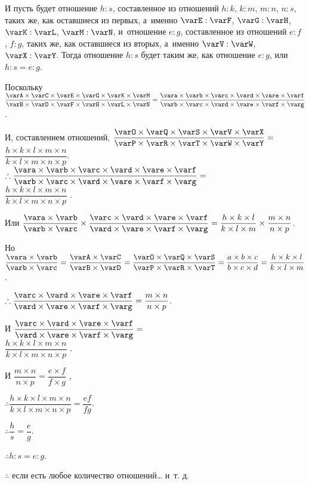 \documentclass[letters,booklanguage=russian]{byrnebook}
\begin{document}
И пусть будет отношение $h : s$, составленное из отношений $h : k$, $k : m$, $m : n$, $n : s$, таких же, как оставшиеся из первых, а~именно $\varE : \varF$, $\varG : \varH$, $\varK : \varL$, $\varM : \varN$, и~отношение $e : g$, составленное из отношений $e : f$ , $f : g$, таких же, как оставшиеся из вторых, а~именно $\varV : \varW$, $\varX : \varY$.  Тогда отношение $h : s$  будет таким же, как отношение $e : g$, или $h : s = e : g$.

\begin{center}
Поскольку $\dfrac
{\varA \times \varC \times \varE \times \varG \times \varK \times \varM}
{\varB \times \varD \times \varF \times \varH \times \varL \times \varN}
=
\dfrac
{\vara \times \varb \times \varc \times \vard \times \vare \times \varf}
{\varb \times \varc \times \vard \times \vare \times \varf \times \varg}$.

И, составлением отношений, $\dfrac
{\varO \times \varQ \times \varS \times \varV \times \varX}
{\varP \times \varR \times \varT \times \varW \times \varY}
=$\\
$\dfrac
{h \times k \times l \times m \times n}
{k \times l \times m \times n \times p}$.\\

$\therefore \dfrac
{\vara \times \varb \times \varc \times \vard \times \vare \times \varf}
{\varb \times \varc \times \vard \times \vare \times \varf \times \varg}
=$\\
$\dfrac
{h \times k \times l \times m \times n}
{k \times l \times m \times n \times p}$ \byref{\hypref}.

Или $\dfrac{\vara \times \varb}{\varb \times \varc}
\times
\dfrac
{\varc \times \vard \times \vare \times \varf}
{\vard \times \vare \times \varf \times \varg}
=
\dfrac
{h \times k \times l}
{k \times l \times m}
\times
\dfrac
{m \times n}
{n \times p}$.

Но $\dfrac{\vara \times \varb}{\varb \times \varc} = \dfrac{\varA \times \varC}{\varB \times \varD}
=
\dfrac
{\varO \times \varQ \times \varS}
{\varP \times \varR \times \varT}
=
\dfrac{a \times b \times c}{b \times c \times d}
=
\dfrac{h \times k \times l}{k \times l \times m}$.

$\therefore
\dfrac
{\varc \times \vard \times \vare \times \varf}
{\vard \times \vare \times \varf \times \varg}
=
\dfrac
{m \times n}
{n \times p}$.

И $\dfrac
{\varc \times \vard \times \vare \times \varf}
{\vard \times \vare \times \varf \times \varg}
=$\\
$\dfrac
{h \times k \times l \times m \times n}
{k \times l \times m \times n \times p}$ \byref{\hypref}.

И $\dfrac
{m \times n}
{n \times p}
=
\dfrac
{e \times f}
{f \times g}$ \byref{\hypref},

$\therefore \dfrac
{h \times k \times l \times m \times n}
{k \times l \times m \times n \times p}
= \dfrac{e f}{f g}$.

$\therefore \dfrac{h}{s} = \dfrac{e}{g}$.

$\therefore h : s = e : g$.

$\therefore$ если есть любое количество отношений… и~т. д.
\end{center}
\end{document}
